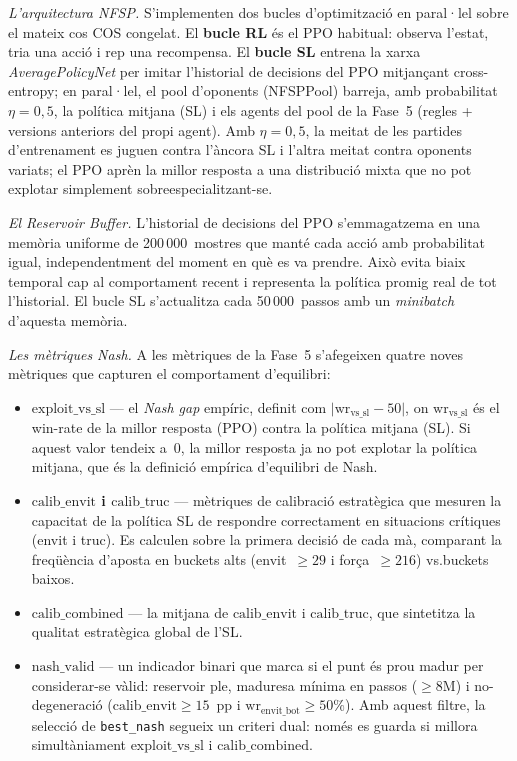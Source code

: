 \emph{L'arquitectura NFSP.} S'implementen dos bucles d'optimització en paral·lel sobre
el mateix cos COS congelat. El \textbf{bucle RL} és el PPO habitual: observa
l'estat, tria una acció i rep una recompensa. El \textbf{bucle \ac{SL}} entrena la xarxa
\emph{AveragePolicyNet} per imitar l'historial de decisions del PPO mitjançant
cross-entropy; en paral·lel, el pool d'oponents (NFSPPool) barreja, amb probabilitat
\(\eta = 0{,}5\), la política mitjana (SL) i els agents del pool de la Fase~5 (regles +
versions anteriors del propi agent). Amb \(\eta = 0{,}5\), la meitat de les partides d'entrenament es juguen
contra l'àncora SL i l'altra meitat contra oponents variats; el PPO aprèn la millor
resposta a una distribució mixta que no pot explotar simplement sobreespecialitzant-se.

\emph{El Reservoir Buffer.} L'historial de decisions del PPO s'emmagatzema en una
memòria uniforme de 200\,000~mostres que manté cada acció amb probabilitat igual,
independentment del moment en què es va prendre. Això evita biaix temporal cap al
comportament recent i representa la política promig real de tot l'historial. El bucle
\ac{SL} s'actualitza cada 50\,000~passos amb un \emph{minibatch} d'aquesta memòria.

\emph{Les mètriques Nash.} A les mètriques de la Fase~5 s'afegeixen quatre noves
mètriques que capturen el comportament d'equilibri:
\begin{itemize}
  \item \textbf{\(\text{exploit\_vs\_sl}\)} — el \emph{Nash gap} empíric, definit com
        \(\lvert \text{wr}_{\text{vs\_sl}} - 50 \rvert\), on \(\text{wr}_{\text{vs\_sl}}\)
        és el win-rate de la millor resposta (PPO) contra la política mitjana (SL). Si
        aquest valor tendeix a~0, la millor resposta ja no pot explotar la política
        mitjana, que és la definició empírica d'equilibri de Nash.
  \item \textbf{\(\text{calib\_envit}\) i \(\text{calib\_truc}\)} — mètriques de
        calibració estratègica que mesuren la capacitat de la política \ac{SL} de
        respondre correctament en situacions crítiques (envit i truc). Es calculen sobre
        la primera decisió de cada mà, comparant la freqüència d'aposta en buckets
        alts (envit~$\geq 29$ i força~$\geq 216$) vs.\@ buckets baixos.
  \item \textbf{\(\text{calib\_combined}\)} — la mitjana de \(\text{calib\_envit}\) i
        \(\text{calib\_truc}\), que sintetitza la qualitat estratègica global de
        l'\ac{SL}.
  \item \textbf{\(\text{nash\_valid}\)} — un indicador binari que marca si el punt és
        prou madur per considerar-se vàlid: reservoir ple, maduresa mínima en passos
        (\(\geq 8\)M) i no-degeneració (\(\text{calib\_envit}\geq 15\)~pp i
        \(\text{wr}_{\text{envit\_bot}}\geq 50\%\)). Amb aquest filtre, la selecció de
        \texttt{best\_nash} segueix un criteri dual: només es guarda si millora
        simultàniament \(\text{exploit\_vs\_sl}\) i \(\text{calib\_combined}\).
\end{itemize}

